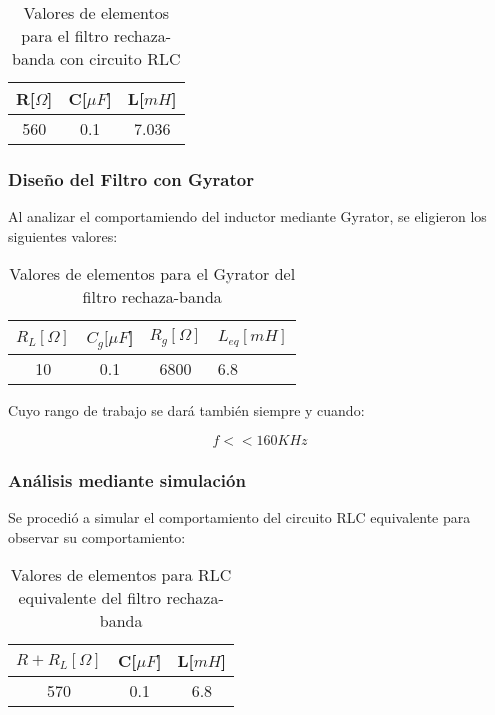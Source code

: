 \begin{table}[H]
    \centering
    \begin{tabular}{|c|c|c|}
    \hline
    \rowcolor[HTML]{C0C0C0} 
    R[$\Omega$] & C[$\mu F$] & L[$mH$]  \\ \hline
    560     & 0.1  & 7.036 \\ \hline
    \end{tabular}
    \caption{Valores de elementos para el filtro rechaza-banda con circuito RLC}
    \end{table}

\subsubsection{Diseño del Filtro con Gyrator}

Al analizar el comportamiendo del inductor mediante Gyrator, se eligieron los siguientes valores:

\begin{table}[H]
    \centering
    \begin{tabular}{|c|c|c|l|}
    \hline
    \rowcolor[HTML]{C0C0C0} 
    $R_L[\Omega]$ & $C_g[\mu F$] & $R_g[\Omega]$  & $L_{eq}[mH]$ \\ \hline
    10      & 0.1  & 6800 & 6.8        \\ \hline
    \end{tabular}
    \caption{Valores de elementos para el Gyrator del filtro rechaza-banda}
    \end{table}

Cuyo rango de trabajo se dará también siempre y cuando:

$$f << 160 KHz$$

\subsubsection{Análisis mediante simulación}

Se procedió a simular el comportamiento del circuito RLC equivalente para observar su comportamiento:

\begin{table}[H]
    \centering
    \begin{tabular}{|c|c|c|}
    \hline
    \rowcolor[HTML]{C0C0C0} 
    $R+R_L[\Omega]$ & C[$\mu F$] & L[$mH$]  \\ \hline
    570      & 0.1  & 6.8 \\ \hline
    \end{tabular}
    \caption{Valores de elementos para RLC equivalente del filtro rechaza-banda}
    \end{table}

